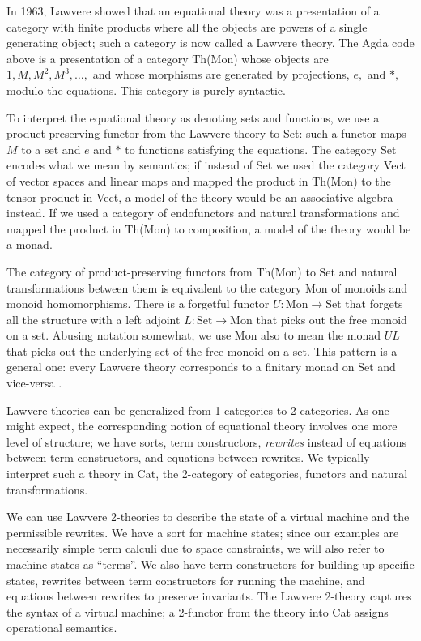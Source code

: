 \documentclass{article}
\newcommand{\maps}{\colon}
\newcommand{\Set}{\mathrm{Set}}
\newcommand{\Mon}{\mathrm{Mon}}
\begin{document}
  In 1963, Lawvere \cite{Lawvere} showed that an equational theory was a presentation of a category with finite products where all the objects are powers of a single generating object; such a category is now called a Lawvere theory.  The Agda code above is a presentation of a category Th(Mon) whose objects are $1, M, M^2, M^3, \ldots,$ and whose morphisms are generated by projections, $e,$ and $*,$ modulo the equations.  This category is purely syntactic.

  To interpret the equational theory as denoting sets and functions, we use a product-preserving functor from the Lawvere theory to Set: such a functor maps $M$ to a set and $e$ and $*$ to functions satisfying the equations.  The category Set encodes what we mean by semantics; if instead of Set we used the category Vect of vector spaces and linear maps and mapped the product in Th(Mon) to the tensor product in Vect, a model of the theory would be an associative algebra instead.  If we used a category of endofunctors and natural transformations and mapped the product in Th(Mon) to composition, a model of the theory would be a monad.

  The category of product-preserving functors from Th(Mon) to Set and natural transformations between them is equivalent to the category Mon of monoids and monoid homomorphisms.  There is a forgetful functor $U\maps \Mon \to \Set$ that forgets all the structure with a left adjoint $L\maps \Set \to \Mon$ that picks out the free monoid on a set.  Abusing notation somewhat, we use Mon also to mean the monad $UL$ that picks out the underlying set of the free monoid on a set.  This pattern is a general one: every Lawvere theory corresponds to a finitary monad on Set and vice-versa \cite{HylandPower}.

  Lawvere theories can be generalized from 1-categories to 2-categories.  As one might expect, the corresponding notion of equational theory involves one more level of structure; we have sorts, term constructors, {\em rewrites} instead of equations between term constructors, and equations between rewrites.  We typically interpret such a theory in Cat, the 2-category of categories, functors and natural transformations.

  We can use Lawvere 2-theories to describe the state of a virtual machine and the permissible rewrites.  We have a sort for machine states; since our examples are necessarily simple term calculi due to space constraints, we will also refer to machine states as ``terms''.  We also have term constructors for building up specific states, rewrites between term constructors for running the machine, and equations between rewrites to preserve invariants.  The Lawvere 2-theory captures the syntax of a virtual machine; a 2-functor from the theory into Cat assigns operational semantics.
\end{document}

